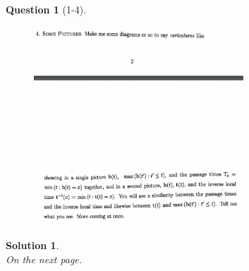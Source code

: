 \documentclass[11pt]{article}
\theoremstyle{plain}
\theoremstyle{quest}
\newtheorem*{question}{Question}
\newtheorem*{solution}{Solution}
\begin{document}
\begin{question}[1-4]
\hfill
\begin{figure}[h!]
  \centering
    \includegraphics[width=0.7\textwidth]{limthm2-f-p4.png}
\end{figure}
\end{question}
\begin{solution} \hfill \\
On the next page.

\end{solution}

\newpage
\end{document}
